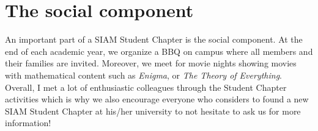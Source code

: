 \documentclass{article}
\begin{document}
 \section*{The social component}
 An important part of a SIAM Student Chapter is the social component. At the end of each academic year, we organize a BBQ on campus where all members and their families are invited. Moreover, we meet for movie nights showing movies with mathematical content such as \textit{Enigma}, or \textit{The Theory of Everything}. Overall, I met a lot of enthusiastic colleagues through the Student Chapter activities which is why we also encourage everyone who considers to found a new SIAM Student Chapter at his/her university to not hesitate to ask us for more information!
 
\end{document}
